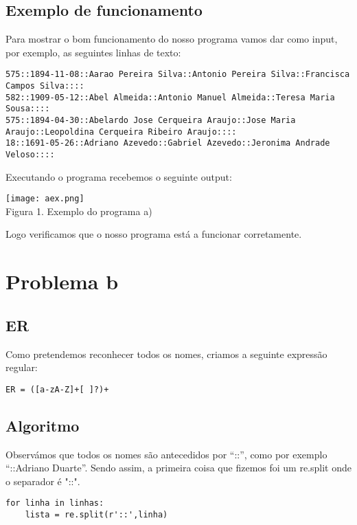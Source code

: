 \documentclass[11pt,a4paper]{report}%
\begin{document}
\subsection{Exemplo de funcionamento}

Para mostrar o bom funcionamento do nosso programa vamos dar como input, por exemplo, as seguintes linhas de texto:

\begin{verbatim}
575::1894-11-08::Aarao Pereira Silva::Antonio Pereira Silva::Francisca Campos Silva::::
582::1909-05-12::Abel Almeida::Antonio Manuel Almeida::Teresa Maria Sousa::::
575::1894-04-30::Abelardo Jose Cerqueira Araujo::Jose Maria Araujo::Leopoldina Cerqueira Ribeiro Araujo::::
18::1691-05-26::Adriano Azevedo::Gabriel Azevedo::Jeronima Andrade Veloso::::
\end{verbatim}

Executando o programa recebemos o seguinte output:


\begin{center}
    \texttt{[image: aex.png]}
    \\
    \caption{Figura 1. Exemplo do programa a)}
\end{center}

Logo verificamos que o nosso programa está a funcionar corretamente.


\newpage
\section{Problema b}

\subsection{ER}

Como pretendemos reconhecer todos os nomes, criamos a seguinte expressão regular:

\begin{verbatim}
ER = ([a-zA-Z]+[ ]?)+
\end{verbatim}

\subsection{Algoritmo}

Observámos que todos os nomes são antecedidos por “::”, como por exemplo “::Adriano Duarte”. Sendo assim, a primeira coisa que fizemos foi um re.split
onde o separador é "::". 

\begin{verbatim}
for linha in linhas: 
    lista = re.split(r'::',linha)
\end{verbatim}
\end{document}

